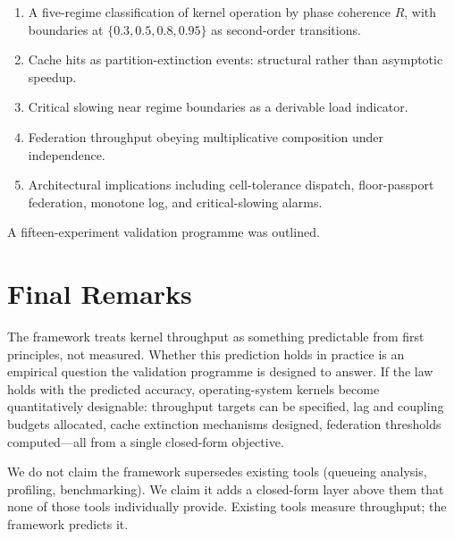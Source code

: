 \documentclass[twocolumn,11pt,a4paper]{article}
\newcommand{\Rens}{R}
\begin{document}
\begin{enumerate}[nosep,leftmargin=*]
\item A five-regime classification of kernel operation by phase coherence $\Rens$, with boundaries at $\{0.3, 0.5, 0.8, 0.95\}$ as second-order transitions.
\item Cache hits as partition-extinction events: structural rather than asymptotic speedup.
\item Critical slowing near regime boundaries as a derivable load indicator.
\item Federation throughput obeying multiplicative composition under independence.
\item Architectural implications including cell-tolerance dispatch, floor-passport federation, monotone log, and critical-slowing alarms.
\end{enumerate}

A fifteen-experiment validation programme was outlined.

\section{Final Remarks}

The framework treats kernel throughput as something predictable from first principles, not measured. Whether this prediction holds in practice is an empirical question the validation programme is designed to answer. If the law holds with the predicted accuracy, operating-system kernels become quantitatively designable: throughput targets can be specified, lag and coupling budgets allocated, cache extinction mechanisms designed, federation thresholds computed---all from a single closed-form objective.

We do not claim the framework supersedes existing tools (queueing analysis, profiling, benchmarking). We claim it adds a closed-form layer above them that none of those tools individually provide. Existing tools measure throughput; the framework predicts it.



\end{document}

